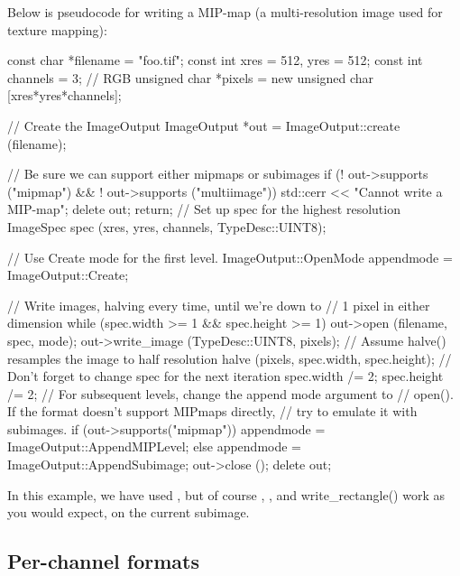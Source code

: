 Below is pseudocode for writing a MIP-map (a multi-resolution image
used for texture mapping):

\begin{code}
        const char *filename = "foo.tif";
        const int xres = 512, yres = 512;
        const int channels = 3;  // RGB
        unsigned char *pixels = new unsigned char [xres*yres*channels];

        // Create the ImageOutput
        ImageOutput *out = ImageOutput::create (filename);

        // Be sure we can support either mipmaps or subimages
        if (! out->supports ("mipmap") && ! out->supports ("multiimage")) {
            std::cerr << "Cannot write a MIP-map\n";
            delete out;
            return;
        }
        // Set up spec for the highest resolution
        ImageSpec spec (xres, yres, channels, TypeDesc::UINT8);

        // Use Create mode for the first level.
        ImageOutput::OpenMode appendmode = ImageOutput::Create;

        // Write images, halving every time, until we're down to
        // 1 pixel in either dimension
        while (spec.width >= 1 && spec.height >= 1) {
            out->open (filename, spec, mode);
            out->write_image (TypeDesc::UINT8, pixels);
            // Assume halve() resamples the image to half resolution
            halve (pixels, spec.width, spec.height);
            // Don't forget to change spec for the next iteration
            spec.width /= 2;
            spec.height /= 2;
            // For subsequent levels, change the append mode argument to
            // open().  If the format doesn't support MIPmaps directly,
            // try to emulate it with subimages.
            if (out->supports("mipmap"))
                appendmode = ImageOutput::AppendMIPLevel;
            else
                appendmode = ImageOutput::AppendSubimage;
        }
        out->close ();
        delete out;
\end{code}

In this example, we have used \writeimage, but of course \writescanline,
\writetile, and {\cf write_rectangle()} work as you would expect, on the
current subimage.


\subsection{Per-channel formats}
\label{sec:imageoutput:channelformats}

